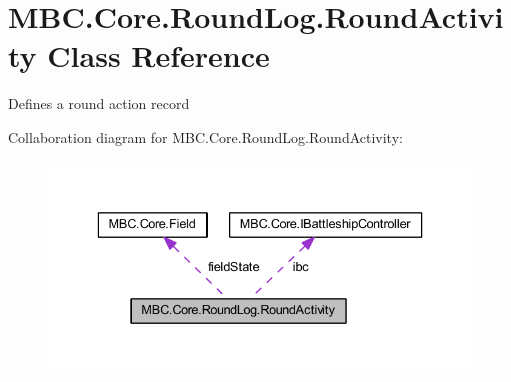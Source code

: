 \hypertarget{class_m_b_c_1_1_core_1_1_round_log_1_1_round_activity}{\section{M\-B\-C.\-Core.\-Round\-Log.\-Round\-Activity Class Reference}
\label{class_m_b_c_1_1_core_1_1_round_log_1_1_round_activity}
}


Defines a round action record 




Collaboration diagram for M\-B\-C.\-Core.\-Round\-Log.\-Round\-Activity\-:
\nopagebreak
\begin{figure}[H]
\begin{center}
\leavevmode
\includegraphics[width=336pt]{class_m_b_c_1_1_core_1_1_round_log_1_1_round_activity__coll__graph}
\end{center}
\end{figure}
